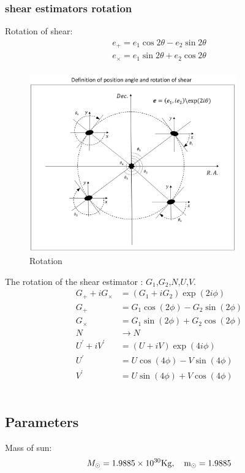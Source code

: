 \documentclass[12pt, a4paper]{article}
\begin{document}
\subsubsection{shear estimators rotation}
Rotation of shear:
\begin{align}
e_{+} = e_1 \cos 2\theta - e_2 \sin 2\theta \nonumber \\
e_{\times} = e_1 \sin 2\theta + e_2 \cos 2\theta \nonumber \\
\end{align}

\begin{figure}[h]
\centering
\includegraphics[width=0.8\textwidth]{rotation.png}
\caption{Rotation}
\label{rotation}
\end{figure}

The rotation of the shear estimator : $G_1$,$G_2$,$N$,$U$,$V$.
\begin{align} 
G_{+}+ iG_{\times} &= (G_1+iG_2) \exp (2i\phi) \\
G_{+} &= G_1\cos (2\phi)  - G_2\sin (2\phi) \\
G_{\times} &= G_1\sin (2\phi)  + G_2\cos (2\phi) \\
N &\rightarrow N \\
U^{\prime}+iV^{\prime} &= (U+iV)\exp (4i\phi) \\
U^{\prime} &= U\cos (4\phi)  - V\sin (4\phi) \\
V^{\prime} &= U\sin (4\phi)  + V\cos (4\phi) 
\end{align}
\\

\subsection{Parameters}
Mass of sun:
\begin{equation}
M_{\odot} = 1.9885 \times 10^{30} \rm{Kg},\quad m_{\odot} = 1.9885
\end{equation} 
\end{document}
